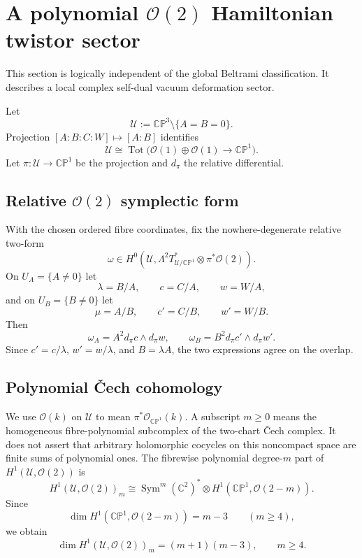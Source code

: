 \documentclass[aps,prd,reprint,nofootinbib,superscriptaddress]{revtex4-2}
\theoremstyle{definition}
\theoremstyle{remark}
\newcommand{\C}{\mathbb{C}}
\newcommand{\CP}{\mathbb{CP}}
\newcommand{\cO}{\mathcal{O}}
\newcommand{\cU}{\mathcal{U}}
\newcommand{\Sym}{\operatorname{Sym}}
\begin{document}
\section{A polynomial \texorpdfstring{$\cO(2)$}{O(2)} Hamiltonian twistor sector}
\label{sec:twistor}

This section is logically independent of the global Beltrami classification. It describes a local complex self-dual vacuum deformation sector.

Let
\begin{equation}
\cU:=\CP^3\setminus\{A=B=0\}.
\label{eq:Udef}
\end{equation}
Projection $[A:B:C:W]\mapsto[A:B]$ identifies
\begin{equation}
\cU\cong\operatorname{Tot}\bigl(\cO(1)\oplus\cO(1)\to\CP^1\bigr).
\label{eq:totalspace}
\end{equation}
Let $\pi:\cU\to\CP^1$ be the projection and $d_\pi$ the relative differential.

\subsection{Relative \texorpdfstring{$\cO(2)$}{O(2)} symplectic form}

With the chosen ordered fibre coordinates, fix the nowhere-degenerate relative two-form
\begin{equation}
\omega\in H^0\!\left(
\cU,\Lambda^2T^*_{\cU/\CP^1}\otimes\pi^*\cO(2)
\right).
\label{eq:omegaGlobal}
\end{equation}
On $U_A=\{A\ne0\}$ let
\[
\lambda=B/A,
\qquad c=C/A,
\qquad w=W/A,
\]
and on $U_B=\{B\ne0\}$ let
\[
\mu=A/B,
\qquad c'=C/B,
\qquad w'=W/B.
\]
Then
\begin{equation}
\omega_A=A^2d_\pi c\wedge d_\pi w,
\qquad
\omega_B=B^2d_\pi c'\wedge d_\pi w'.
\label{eq:omegaCharts}
\end{equation}
Since $c'=c/\lambda$, $w'=w/\lambda$, and $B=\lambda A$, the two expressions agree on the overlap.

\subsection{Polynomial \v{C}ech cohomology}

We use $\cO(k)$ on $\cU$ to mean $\pi^*\cO_{\CP^1}(k)$. A subscript $m\ge0$ means the homogeneous fibre-polynomial subcomplex of the two-chart \v{C}ech complex. It does not assert that arbitrary holomorphic cocycles on this noncompact space are finite sums of polynomial ones. The fibrewise polynomial degree-$m$ part of $H^1(\cU,\cO(2))$ is
\begin{equation}
H^1(\cU,\cO(2))_m
\cong
\Sym^m(\C^2)^*\otimes H^1(\CP^1,\cO(2-m)).
\label{eq:gradedH1}
\end{equation}
Since
\begin{equation}
\dim H^1(\CP^1,\cO(2-m))=m-3
\qquad(m\ge4),
\label{eq:H1base}
\end{equation}
we obtain
\begin{equation}
\dim H^1(\cU,\cO(2))_m=(m+1)(m-3),
\qquad m\ge4.
\label{eq:H1dim}
\end{equation}
\end{document}
